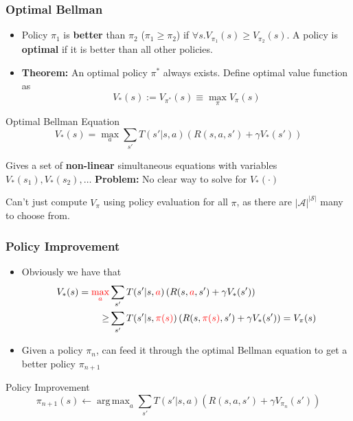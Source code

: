 \documentclass[10pt,a4paper]{beamer}
\renewcommand{\S}{\mathcal{S}}
\newcommand{\A}{\mathcal{A}}
\DeclareMathOperator*{\argmax}{arg\,max}
\newcommand{\red}[1]{\textcolor{red}{#1}}
\begin{document}
\begin{frame}
	\frametitle{Optimal Bellman}
	\begin{itemize}
		\item Policy $\pi_1$ is \textbf{better} than $\pi_2$ ($\pi_1 \geq \pi_2$)
		if $\forall s. V_{\pi_1}(s) \geq V_{\pi_2}(s)$. A policy is \textbf{optimal}
		if it is better than all other policies. 
		\pause
		\item \textbf{Theorem:} An optimal policy $\pi^*$ always exists. 
		Define optimal value function as 
		$$
		V_*(s) := V_{\pi^*}(s) \equiv \max_{\pi} V_{\pi}(s)
		$$
		\pause
	\end{itemize}

\begin{block}{Optimal Bellman Equation}
	$$
	V_*(s) = \max_a \sum_{s'} T(s' | s, a) \left( R(s,a,s') + \gamma V_*(s') \right)
	$$
\end{block}
\pause
Gives a set of \textbf{non-linear} simultaneous equations with variables
$ V_*(s_1),  V_*(s_2), \ldots$
\pause
\textbf{Problem:} No clear way to solve for $V_*(\cdot)$
\pause

Can't just compute $V_\pi$ using policy evaluation for all $\pi$, as
there are $|\A|^{|\S|}$ many to choose from.

\end{frame}

\begin{frame}
	\frametitle{Policy Improvement}
	\begin{itemize}
		\item Obviously we have that
		\begin{align*}
		V_*(s) = \red{\max_a} &\sum_{s'} T(s' | s, \red{a}) \left( R(s,\red{a},s') + \gamma V_*(s') \right) \\
		\geq 
		& \sum_{s'} T(s' | s, \red{\pi(s)}) \left( R(s,\red{\pi(s)},s') + \gamma V_*(s') \right) = V_\pi(s)
		\end{align*}
		\pause
		
		\item Given a policy $\pi_n$, can feed it through the optimal Bellman
		equation to get a better policy $\pi_{n+1}$
	\end{itemize}
\pause
\begin{block}{Policy Improvement}
$$
\pi_{n+1}(s) \leftarrow \argmax_a \sum_{s'} T(s' | s,a) 
\left( R(s,a,s') + \gamma V_{\pi_n}(s') \right)
$$
\end{block}
\end{frame}
\end{document}
